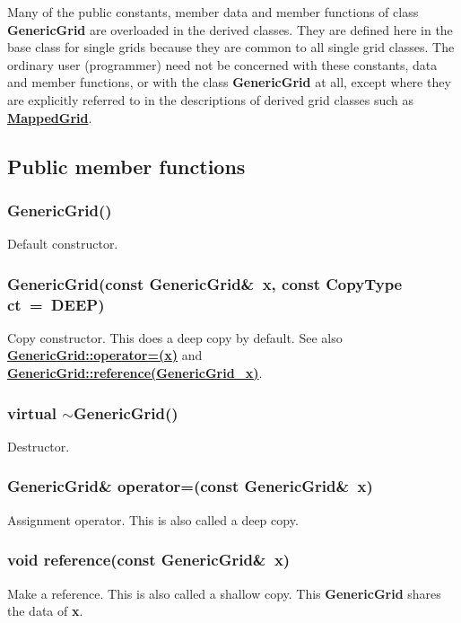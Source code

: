 \documentclass{article}
\begin{document}
Many of the public constants, member data and member functions of class
\textbf{GenericGrid} are overloaded in the derived classes.  They are
defined here in the base class for single grids because they are common
to all single grid classes.  The ordinary user (programmer) need not be
concerned with these constants, data and member functions, or with the
class \textbf{GenericGrid} at all, except where they are explicitly
referred to in the descriptions of derived grid classes such as
{\bf{}\hyperref{MappedGrid}{MappedGrid \rm(\S}{)}{MappedGrid}}.

\subsection{Public member functions}
\label{GenericGrid::PublicMemberFunctions}

  \subsubsection{GenericGrid()}
  \label{GenericGrid::GenericGrid()}
    Default constructor.
  \subsubsection{GenericGrid(const GenericGrid\&~x, const CopyType ct~=~DEEP)}
  \label{GenericGrid::GenericGrid(x,ct)}
    Copy constructor.  This does a deep copy by default.
    See also {\bf{}\hyperref{operator=(x)}{operator=(x) \rm(\S}{)}{GenericGrid::operator=(x)}}
    and {\bf{}\hyperref{reference(x)}{reference(x) \rm(\S}{)}{GenericGrid::reference(GenericGrid_x)}}.
  \subsubsection{virtual $\sim$GenericGrid()}
  \label{GenericGrid::tilde_GenericGrid()}
    Destructor.
  \subsubsection{GenericGrid\& operator=(const GenericGrid\&~x)}
  \label{GenericGrid::operator=(x)}
    Assignment operator.  This is also called a deep copy.
  \subsubsection{void reference(const GenericGrid\&~x)}
  \label{GenericGrid::reference(GenericGrid_x)}
    Make a reference.  This is also called a shallow copy.  
    This \textbf{GenericGrid} shares the data of \textbf{x}.
\end{document}
